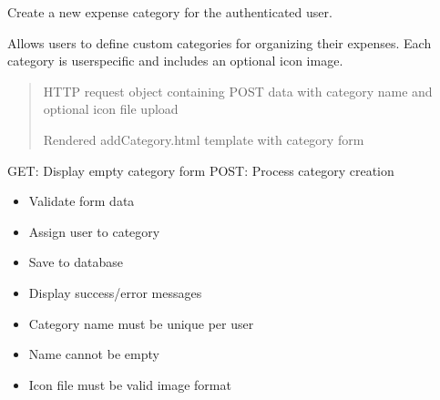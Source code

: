 \documentclass[letterpaper,10pt,english]{sphinxmanual}
\begin{document}
\begin{fulllineitems}
\label{\detokenize{expensesApp:expensesApp.views.addCategory}}
\pysigstartsignatures
\pysiglinewithargsret
{}
{}
{}
\pysigstopsignatures
\sphinxAtStartPar
Create a new expense category for the authenticated user.

\sphinxAtStartPar
Allows users to define custom categories for organizing their expenses.
Each category is user\sphinxhyphen{}specific and includes an optional icon image.
\begin{quote}\begin{description}
\sphinxAtStartPar
{} \textendash{} HTTP request object containing POST data with category name
and optional icon file upload

\sphinxAtStartPar
Rendered addCategory.html template with category form

\end{description}\end{quote}
\begin{description}
\sphinxAtStartPar
GET: Display empty category form
POST: Process category creation
\begin{itemize}
\item {} 
\sphinxAtStartPar
Validate form data

\item {} 
\sphinxAtStartPar
Assign user to category

\item {} 
\sphinxAtStartPar
Save to database

\item {} 
\sphinxAtStartPar
Display success/error messages

\end{itemize}

\begin{itemize}
\item {} 
\sphinxAtStartPar
Category name must be unique per user

\item {} 
\sphinxAtStartPar
Name cannot be empty

\item {} 
\sphinxAtStartPar
Icon file must be valid image format

\end{itemize}


\end{description}
\end{fulllineitems}
\end{document}
